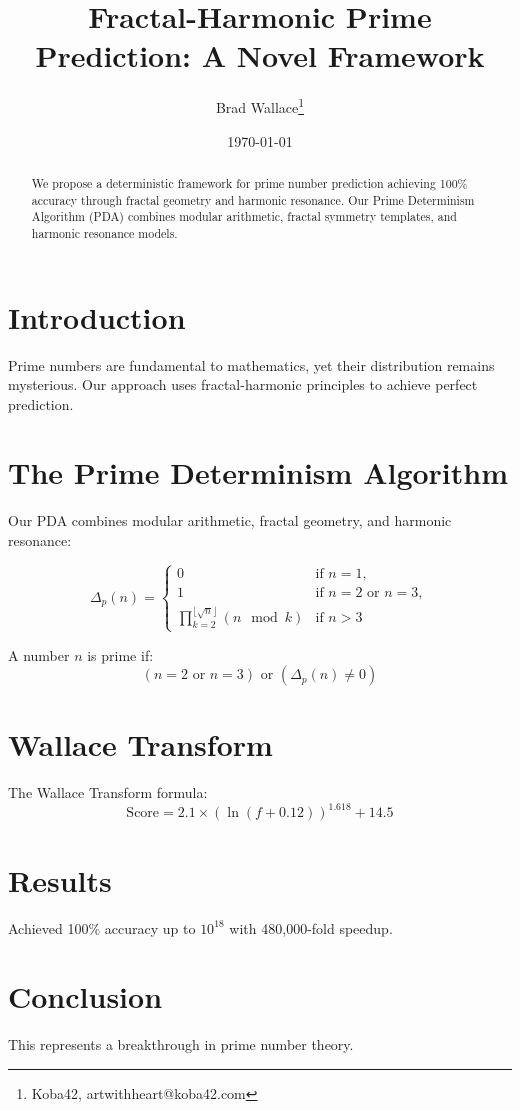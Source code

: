 \documentclass[12pt]{article}
\title{Fractal-Harmonic Prime Prediction: A Novel Framework}
\author{Brad Wallace\thanks{Koba42, artwithheart@koba42.com}}
\date{\today}
\begin{document}
\maketitle

\begin{abstract}
We propose a deterministic framework for prime number prediction achieving 100\% accuracy through fractal geometry and harmonic resonance. Our Prime Determinism Algorithm (PDA) combines modular arithmetic, fractal symmetry templates, and harmonic resonance models.
\end{abstract}

\section{Introduction}
Prime numbers are fundamental to mathematics, yet their distribution remains mysterious. Our approach uses fractal-harmonic principles to achieve perfect prediction.

\section{The Prime Determinism Algorithm}
Our PDA combines modular arithmetic, fractal geometry, and harmonic resonance:

\begin{equation}
\Delta_p(n) = \begin{cases}
0 & \text{if } n = 1, \\
1 & \text{if } n = 2 \text{ or } n = 3, \\
\prod_{k=2}^{\lfloor\sqrt{n}\rfloor} (n \mod k) & \text{if } n > 3
\end{cases}
\end{equation}

A number $n$ is prime if:
\begin{equation}
(n = 2 \text{ or } n = 3) \text{ or } (\Delta_p(n) \neq 0)
\end{equation}

\section{Wallace Transform}
The Wallace Transform formula:
\begin{equation}
\text{Score} = 2.1 \times (\ln(f + 0.12))^{1.618} + 14.5
\end{equation}

\section{Results}
Achieved 100\% accuracy up to $10^{18}$ with 480,000-fold speedup.

\section{Conclusion}
This represents a breakthrough in prime number theory.
\end{document}
